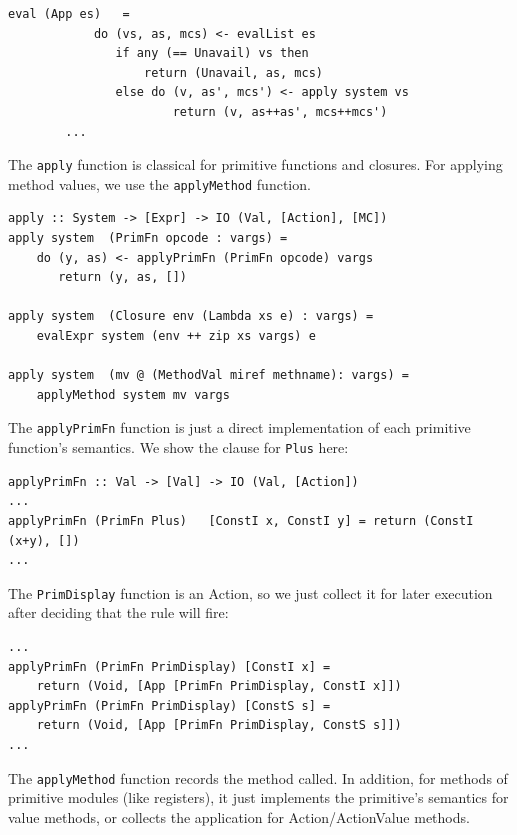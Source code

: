 \documentclass[11pt]{article}
\newcommand{\term}[1]{\texttt{#1}}
\begin{document}
\begin{Verbatim}[frame=single, commandchars=\\\{\}]
        eval (App es)   =
            do (vs, as, mcs) <- evalList es
               if any (== Unavail) vs then
                   return (Unavail, as, mcs)
               else do (v, as', mcs') <- apply system vs
                       return (v, as++as', mcs++mcs')
        ...
\end{Verbatim}

The \term{apply} function is classical for primitive functions and
closures.  For applying method values, we use the \term{applyMethod}
function.

\begin{Verbatim}[frame=single, commandchars=\\\{\}]
apply :: System -> [Expr] -> IO (Val, [Action], [MC])
apply system  (PrimFn opcode : vargs) =
    do (y, as) <- applyPrimFn (PrimFn opcode) vargs
       return (y, as, [])

apply system  (Closure env (Lambda xs e) : vargs) =
    evalExpr system (env ++ zip xs vargs) e

apply system  (mv @ (MethodVal miref methname): vargs) =
    applyMethod system mv vargs
\end{Verbatim}

The \term{applyPrimFn} function is just a direct implementation of
each primitive function's semantics.  We show the clause for \term{Plus} here:

\begin{Verbatim}[frame=single, commandchars=\\\{\}]
applyPrimFn :: Val -> [Val] -> IO (Val, [Action])
...
applyPrimFn (PrimFn Plus)   [ConstI x, ConstI y] = return (ConstI (x+y), [])
...
\end{Verbatim}

The \term{PrimDisplay} function is an Action, so we just collect it
for later execution after deciding that the rule will fire:

\begin{Verbatim}[frame=single, commandchars=\\\{\}]
...
applyPrimFn (PrimFn PrimDisplay) [ConstI x] =
    return (Void, [App [PrimFn PrimDisplay, ConstI x]])
applyPrimFn (PrimFn PrimDisplay) [ConstS s] =
    return (Void, [App [PrimFn PrimDisplay, ConstS s]])
...
\end{Verbatim}

The \term{applyMethod} function records the method called.  In
addition, for methods of primitive modules (like registers), it just
implements the primitive's semantics for value methods, or collects
the application for Action/ActionValue methods.
\end{document}

